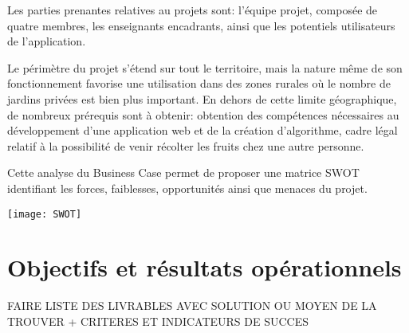 \documentclass{article}
\begin{document}
\vspace{4mm}

Les parties prenantes relatives au projets sont: l'équipe projet, composée de quatre membres, les enseignants encadrants, ainsi que les potentiels utilisateurs de l'application.

Le périmètre du projet s'étend sur tout le territoire, mais la nature même de son fonctionnement favorise une utilisation dans des zones rurales où le nombre de jardins privées est bien plus important.
En dehors de cette limite géographique, de nombreux prérequis sont à obtenir: obtention des compétences nécessaires au développement d'une application web et de la création d'algorithme, cadre légal relatif à la possibilité de venir récolter les fruits chez une autre personne.

\vspace{4mm}
 
Cette analyse du Business Case permet de proposer une matrice SWOT identifiant les forces, faiblesses, opportunités ainsi que menaces du projet.

\vspace{2mm}             
  
\begin{centering}
\texttt{[image: SWOT]}
\end{centering}

\maketitle
\section{Objectifs et résultats opérationnels}


FAIRE LISTE DES LIVRABLES AVEC SOLUTION OU MOYEN DE LA TROUVER +
CRITERES ET INDICATEURS DE SUCCES
\end{document}
